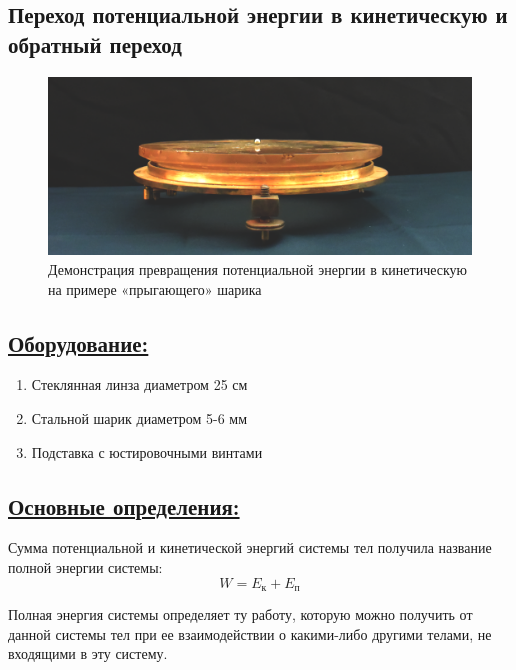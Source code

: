 \documentclass[14pt,a4paper,oneside]{extarticle}	%
\begin{document}

\begin{center}
	\subsection*{Переход потенциальной энергии в кинетическую и обратный переход}
\end{center}

\begin{figure}[H] 
	\centering 	
	\includegraphics[width=0.8\linewidth]{transform-1.png}
	\caption{Демонстрация превращения потенциальной энергии в кинетическую на примере «прыгающего» шарика}
	\label{transform-1}
\end{figure}

\subsection*{\underline{Оборудование:}}

\begin{enumerate}
	\item Стеклянная линза диаметром 25 см 
	\item Стальной шарик диаметром 5-6 мм
	\item Подставка с юстировочными винтами
\end{enumerate}

\subsection*{\underline{Основные определения:}}

Сумма потенциальной и кинетической энергий системы тел 
получила название полной энергии системы: 
$$
	W=E_\text{к} + E_\text{п}
$$

Полная энергия системы определяет ту работу, которую можно 
получить от данной системы тел при ее взаимодействии о какими-либо другими телами, не входящими в эту систему. 
\end{document}
